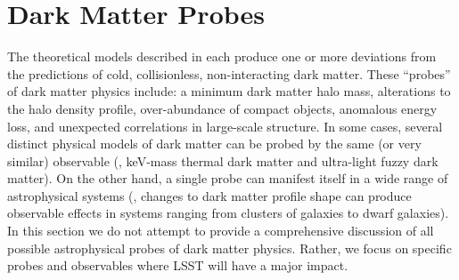 \chapter{Dark Matter Probes}
\label{sec:probes}

The theoretical models described in  each produce one or more deviations from the predictions of cold, collisionless, non-interacting dark matter.
These ``probes'' of dark matter physics include: a minimum dark matter halo mass, alterations to the halo density profile, over-abundance of compact objects, anomalous energy loss, and unexpected correlations in large-scale structure.
In some cases, several distinct physical models of dark matter can be probed by the same (or very similar) observable (\eg, keV-mass thermal dark matter and ultra-light fuzzy dark matter). 
On the other hand, a single probe can manifest itself in a wide range of astrophysical systems (\eg, changes to dark matter profile shape can produce observable effects in systems ranging from clusters of galaxies to dwarf galaxies).
In this section we do not attempt to provide a comprehensive discussion of all possible astrophysical probes of dark matter physics.
Rather, we focus on specific probes and observables where LSST will have a major impact.






